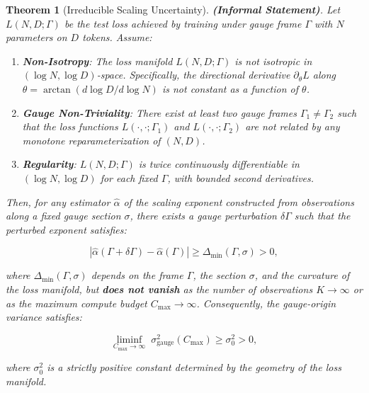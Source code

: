 \documentclass[12pt,a4paper]{article}
\newtheorem{theorem}{Theorem}[section]
\theoremstyle{remark}
\newcommand{\Loss}{L}
\begin{document}
\begin{theorem}[Irreducible Scaling Uncertainty]
\label{thm:irreducible}
\textbf{(Informal Statement)}. Let $\Loss(N, D; \Gamma)$ be the test loss achieved by training under gauge frame $\Gamma$ with $N$ parameters on $D$ tokens. Assume:
\begin{enumerate}[label=(A\arabic*), leftmargin=*]
    \item \textbf{Non-Isotropy}: The loss manifold $\Loss(N, D; \Gamma)$ is not isotropic in $(\log N, \log D)$-space. Specifically, the directional derivative $\partial_\theta \Loss$ along $\theta = \arctan(d\log D / d\log N)$ is not constant as a function of $\theta$.
    \item \textbf{Gauge Non-Triviality}: There exist at least two gauge frames $\Gamma_1 \neq \Gamma_2$ such that the loss functions $\Loss(\cdot, \cdot; \Gamma_1)$ and $\Loss(\cdot, \cdot; \Gamma_2)$ are not related by any monotone reparameterization of $(N, D)$.
    \item \textbf{Regularity}: $\Loss(N, D; \Gamma)$ is twice continuously differentiable in $(\log N, \log D)$ for each fixed $\Gamma$, with bounded second derivatives.
\end{enumerate}

Then, for any estimator $\hat{\alpha}$ of the scaling exponent constructed from observations along a fixed gauge section $\sigma$, there exists a gauge perturbation $\delta\Gamma$ such that the perturbed exponent satisfies:

\begin{equation}
|\hat{\alpha}(\Gamma + \delta\Gamma) - \hat{\alpha}(\Gamma)| \geq \Delta_{\min}(\Gamma, \sigma) > 0,
\label{eq:irreducible_bound}
\end{equation}

where $\Delta_{\min}(\Gamma, \sigma)$ depends on the frame $\Gamma$, the section $\sigma$, and the curvature of the loss manifold, but \textbf{does not vanish} as the number of observations $K \to \infty$ or as the maximum compute budget $C_{\max} \to \infty$. Consequently, the gauge-origin variance satisfies:

\begin{equation}
\liminf_{C_{\max} \to \infty} \; \sigma^2_{\text{gauge}}(C_{\max}) \geq \sigma^2_0 > 0,
\label{eq:limit_inf}
\end{equation}

where $\sigma^2_0$ is a strictly positive constant determined by the geometry of the loss manifold.
\end{theorem}
\end{document}
